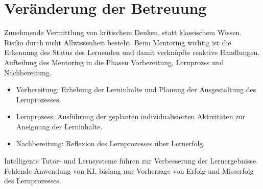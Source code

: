 \section*{Veränderung der Betreuung}
Zunehmende Vermittlung von kritischem Denken, statt klassischem Wissen. Risiko durch nicht \glqq Allwissenheit\grqq{} besteht. Beim Mentoring wichtig ist die Erkennung des Status des Lernenden und damit verknüpfte reaktive Handlungen. Aufteilung des Mentoring in die Phasen Vorbereitung, Lernprozss und Nachbereitung.
\begin{itemize}
    \item Vorbereitung: Erhebung der Lerninhalte und Planung der Ausgestaltung des Lernprozesses.
    \item Lernprozess: Ausführung der geplanten individualisierten Aktivitäten zur Aneignung der Lerninhalte.
    \item Nachbereitung: Reflexion des Lernprozesses über Lernerfolg.
\end{itemize}
Intelligente Tutor- und Lernsysteme führen zur Verbesserung der Lernergebnisse. Fehlende Anwendung von KI, bislang nur Vorhersage von Erfolg und Misserfolg des Lernprozesses.